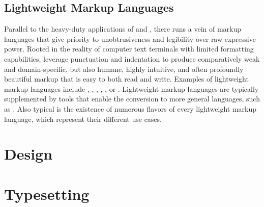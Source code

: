 \documentclass[
  a5paper,10pt,           %
  dvipsnames              %
]{book}
\begin{document}
\section{Lightweight Markup Languages}
Parallel to the heavy-duty applications of  and ,
there runs a vein of markup languages that give priority to unobtrusiveness and
legibility over raw expressive power. Rooted in the reality of computer text
terminals with limited formatting capabilities,  leverage punctuation and indentation to produce comparatively weak and
domain-specific, but also humane, highly intuitive, and often profoundly
beautiful markup that is easy to both read and write. Examples of lightweight
markup languages include , , ,
, , or .  Lightweight markup languages
are typically supplemented by tools that enable the conversion to more general
languages, such as . Also typical is the existence of numerous
flavors of every lightweight markup language, which represent their different
use cases.

\chapter{Design}
\chapter{Typesetting}
%
\end{document}

